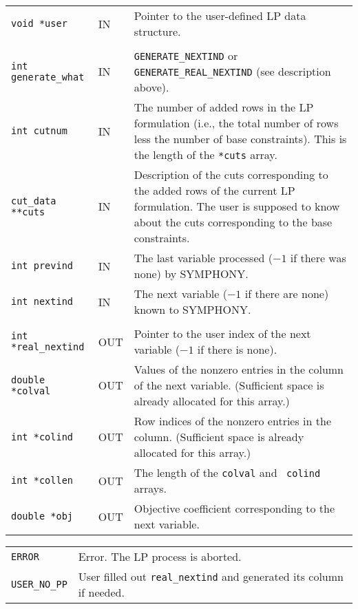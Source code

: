 \documentclass[twoside,11pt]{article}
\begin{document}
{\newpage
\clearpage
\samepage \begin{tabular}{llp{260pt}}
{\tt void *user} &  IN & Pointer to the user-defined LP data structure. \\ 
& & \\ 
{\tt int generate\_what} & IN & {\tt GENERATE\_NEXTIND} or {\tt
GENERATE\_REAL\_NEXTIND} (see description above). \\ 
{\tt int cutnum} & IN & The number of added rows in the LP formulation
(i.e., the total number of rows less the number of base constraints).
This is the length of the {\tt **cuts} array.\\  
{\tt cut\_data **cuts} & IN & Description of the cuts corresponding to
the added rows of the current LP formulation. The user is supposed to
know about the cuts corresponding to the base constraints. \\ 
{\tt int prevind} & IN & The last variable processed ($-1$ if there was
none) by {\sc SYMPHONY}.\\ 
{\tt int nextind} & IN & The next variable ($-1$ if there are none)
known to {\sc SYMPHONY}.\\ 
& & \\ 
{\tt int *real\_nextind} & OUT & Pointer to the user index of the next
variable ($-1$ if there is none). \\ 
{\tt double *colval} & OUT & Values of the nonzero entries in the
column of the next variable. (Sufficient space is already allocated for this
array.) \\ 
{\tt int *colind} & OUT & Row indices of the nonzero entries in the column.
(Sufficient space is already allocated for this array.) \\ 
{\tt int *collen} & OUT & The length of the {\tt colval} and {\tt
colind} arrays.\\ 
{\tt double *obj} & OUT & Objective coefficient corresponding to the
next variable.\\ 
\end{tabular}
}

{\newpage
\clearpage
\samepage \begin{tabular}{lp{300pt}}
{\tt ERROR} & Error. The LP process is aborted.\\ 
{\tt USER\_NO\_PP} & User filled out {\tt *real\_nextind} and
generated its column if needed.\\ 
\end{tabular}
}
\end{document}
